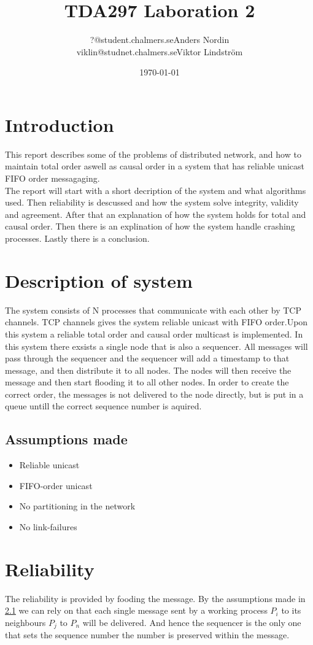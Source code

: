 \documentclass{article}
\title{TDA297 Laboration 2}
\author{?@student.chalmers.se\quad Anders Nordin\\
        viklin@studnet.chalmers.se\quad Viktor Lindstr\"{o}m}
\date{\today}
\begin{document}
\maketitle
\newpage
\section{Introduction}
  This report describes some of the problems of distributed network, and how to maintain
  total order aswell as causal order in a system that has reliable unicast FIFO order messagaging.\\
  The report will start with a short decription of the system and what algorithms 
  used. Then reliability is descussed and how the system solve integrity, validity and
  agreement. After that an explanation of how the system holds for total and causal order.
  Then there is an explination of how the system handle crashing processes. Lastly there
  is a conclusion.
\section{Description of system}
  The system consists of N processes that communicate with each other by TCP channels.
  TCP channels gives the system reliable unicast with FIFO order.Upon this system a 
  reliable total order and causal order multicast is implemented. In this system there
  exsists a single node that is also a sequencer. All messages will pass through the sequencer
  and the sequencer will add a timestamp to that message, and then distribute it to all nodes.
  The nodes will then receive the message and then start flooding it to all other nodes.
  In order to create the correct order, the messages is not delivered to the node directly,
  but is put in a queue untill the correct sequence number is aquired.
  \subsection{Assumptions made}
  \label{assumption}
  \begin{itemize}
  \item Reliable unicast
  \item FIFO-order unicast
  \item No partitioning in the network
  \item No link-failures
  \end{itemize}
\section{Reliability}
  The reliability is provided by fooding the message. By the assumptions made in \ref{assumption} we can rely on 
  that each single message sent by a working process $P_i$ to its neighbours $P_j$ to $P_n$ will be delivered.
  And hence the sequencer is the only one that sets the sequence number the number is preserved within the message.
\end{document}
